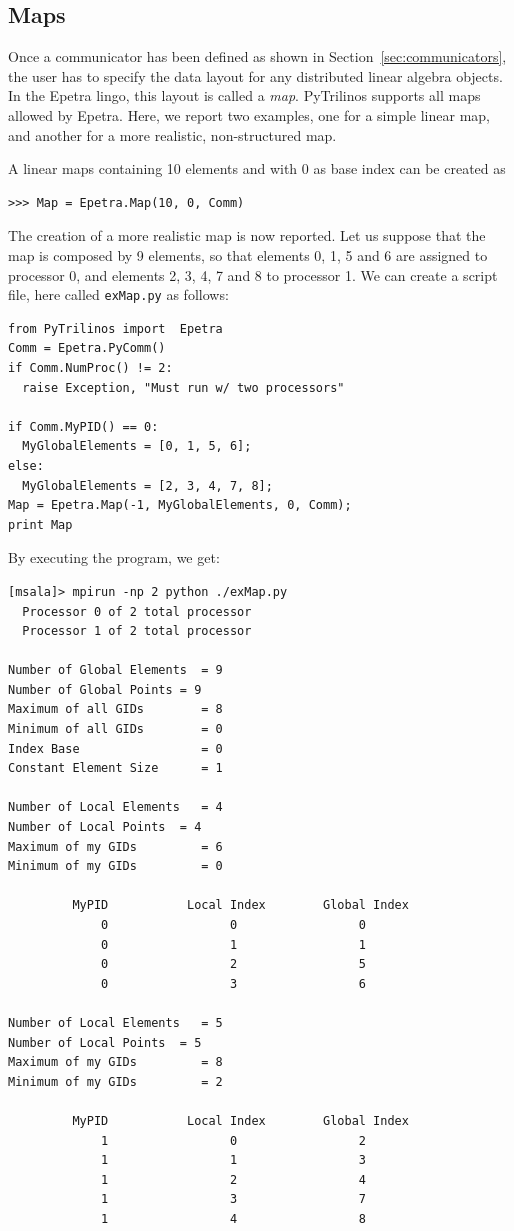 \documentclass[10pt,relax]{SANDreport}
\begin{document}
\subsection{Maps}
\label{sec:maps}

Once a communicator has been defined as shown in
Section~\ref{sec:communicators}, the user has to specify the data layout for
any distributed linear algebra objects. In the Epetra lingo, this layout is
called a {\sl map}. PyTrilinos supports all maps allowed by Epetra. Here, we
report two examples, one for a simple linear map, and another for a more
realistic, non-structured map.

A linear maps containing 10
elements and with 0 as base index can be created as 
\begin{verbatim}
>>> Map = Epetra.Map(10, 0, Comm)
\end{verbatim}
The creation of a more realistic map is now reported. Let us suppose that the
map is composed by 9 elements, so that elements 0, 1, 5 and 6 are assigned to
processor 0, and elements 2, 3, 4, 7 and 8 to processor 1. We can create a
script file, here called {\tt exMap.py} as follows:
\begin{verbatim}
from PyTrilinos import  Epetra
Comm = Epetra.PyComm()
if Comm.NumProc() != 2:
  raise Exception, "Must run w/ two processors"

if Comm.MyPID() == 0:
  MyGlobalElements = [0, 1, 5, 6];
else:
  MyGlobalElements = [2, 3, 4, 7, 8];
Map = Epetra.Map(-1, MyGlobalElements, 0, Comm);
print Map
\end{verbatim}
By executing the program, we get:
\begin{verbatim}
[msala]> mpirun -np 2 python ./exMap.py
  Processor 0 of 2 total processor
  Processor 1 of 2 total processor

Number of Global Elements  = 9
Number of Global Points = 9
Maximum of all GIDs        = 8
Minimum of all GIDs        = 0
Index Base                 = 0
Constant Element Size      = 1

Number of Local Elements   = 4
Number of Local Points  = 4
Maximum of my GIDs         = 6
Minimum of my GIDs         = 0

         MyPID           Local Index        Global Index
             0                 0                 0
             0                 1                 1
             0                 2                 5
             0                 3                 6

Number of Local Elements   = 5
Number of Local Points  = 5
Maximum of my GIDs         = 8
Minimum of my GIDs         = 2

         MyPID           Local Index        Global Index
             1                 0                 2
             1                 1                 3
             1                 2                 4
             1                 3                 7
             1                 4                 8
\end{verbatim}
\end{document}
